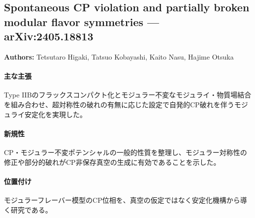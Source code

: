 \subsection{Spontaneous CP violation and partially broken modular flavor symmetries --- arXiv:2405.18813}

\textbf{Authors:} Tetsutaro Higaki, Tatsuo Kobayashi, Kaito Nasu, Hajime Otsuka

\paragraph{主な主張}
Type IIBのフラックスコンパクト化とモジュラー不変なモジュライ・物質場結合を組み合わせ、超対称性の破れの有無に応じた設定で自発的CP破れを伴うモジュライ安定化を実現した\cite{Higaki:2024pql}。

\paragraph{新規性}
CP・モジュラー不変ポテンシャルの一般的性質を整理し、モジュラー対称性の修正や部分的破れがCP非保存真空の生成に有効であることを示した。

\paragraph{位置付け}
モジュラーフレーバー模型のCP位相を、真空の仮定ではなく安定化機構から導く研究である。
